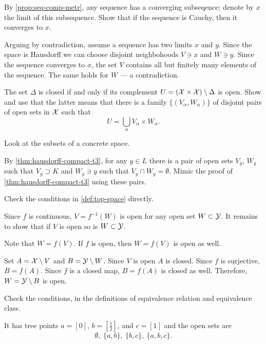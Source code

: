 \begin{multicols}{2}
By \ref{prop:seq-comp-metr}, any sequence has a converging subseqence;
denote by $x$ the limit of this subsequence.
Show that if the sequence is Cauchy, then it converges to $x$.

 Arguing by contradiction, assume a sequence has two limits $x$ and $y$.
Since the space is Hausdorff we can choose disjoint neighbohoods $V\ni x$ and $W\ni y$.
Since the sequence converges to $x$, the set $V$ contains all but finitely many elements of the sequence.
The same holds for $W$ --- a contradiction.

The set $\Delta$ is closed if and only if its complement $U=(\mathcal{X}\times\mathcal{X})\setminus\Delta$ is open.
Show and use that the latter means that there is a family $\{(V_\alpha,W_\alpha)\}$ of disjoint pairs of open sets in $\mathcal{X}$ such that
\[U=\bigcup_\alpha V_\alpha\times W_\alpha.\]

Look at the subsets of a concrete space.

 By \ref{thm:hausdorff-compact-t3}, for any $y\in L$ there is a pair of open sets $V_y$, $W_y$ such that $V_y\supset K$ and $W_y\ni y$
such that $V_y\cap W_y=\emptyset$.
Mimic the proof of \ref{thm:hausdorff-compact-t3} using these pairs.

 Check the conditions in \ref{def:top-space} directly.



Since $f$ is continuous, $V=f^{-1}(W)$ is open for any open set $W\subset \mathcal{Y}$.
It remains to show that if $V$ is open so is $W\subset \mathcal{Y}$.

Note that $W=f(V)$.
If $f$ is open, then $W=f(V)$ is open as well.

Set $A=\mathcal{X}\setminus V$ and $B=\mathcal{Y}\setminus W$.
Since $V$ is open $A$ is closed.
Since $f$ is surjective, $B=f(A)$.
Since $f$ is a closed map, $B=f(A)$ is closed as well.
Therefore, $W=\mathcal{Y}\setminus B$ is open.

Check the conditions, in the definitions of equivalence relation and equivalence class.

It has tree points $a=[0]$, $b=[\tfrac12]$, and $c=[1]$ and the open sets are 
\[\emptyset,\  \{a,b\},\ \{b,c\},\  \{a,b,c\}.\]


\end{multicols}
